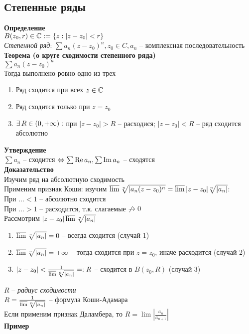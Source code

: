 \documentclass[12pt]{article}
\begin{document}
\subsection{Степенные ряды}
\textbf{Определение}\\
$B(z_0, r) \in \mathbb{C} := \{z: |z-z_0| < r\}$\\
\textit{Степенной ряд}: $\sum a_n(z-z_0)^n, z_0 \in C, a_n$ -- комплексная последовательность\\
\textbf{Теорема (о круге сходимости степенного ряда)}\\
$\sum a_n(z-z_0)^n$\\
Тогда выполнено ровно одно из трех
\begin{enumerate}
    \item Ряд сходится при всех $z \in \mathbb{C}$
    \item Ряд сходится только при $z=z_0$
    \item $\exists\, R \in (0, +\infty): $ при $|z-z_0| > R$ -- расходися; $|z-z_0|<R$ -- ряд сходится абсолютно
\end{enumerate}
\textbf{Утверждение}\\
$\sum a_n$ -- сходится $\Leftrightarrow \sum \operatorname{Re} a_n, \sum \operatorname{Im} a_n$ -- сходятся\\
\textbf{Доказательство}\\
Изучим ряд на абсолютную сходимость\\
Применим признак Коши: изучим $\operatorname*{\overline{lim}} \sqrt[n]{|a_n(z-z_0)^n} = \operatorname*{\overline{lim}} |z-z_0|\sqrt[n]{|a_n|}$:\\
При $\ldots<1$ -- абсолютно сходится\\
При $\ldots > 1$ -- расходится, т.к. слагаемые $\not\rightarrow 0$\\
Рассмотрим $|z-z_0|\operatorname*{\overline{lim}} \sqrt[n]{|a_n|}$
\begin{enumerate}
    \item $\operatorname*{\overline{lim}} \sqrt[n]{|a_n|} = 0$ -- всегда сходится (случай 1)
    \item $\operatorname*{\overline{lim}} \sqrt[n]{|a_n|} = +\infty$ -- тогда сходится при $z=z_0$, иначе расходится (случай 2)
    \item $|z-z_0| < \frac1{\operatorname*{\overline{lim}} \sqrt[n]{|a_n|}} =: R$ -- сходится в $B(z_0, R)$ (случай 3)
\end{enumerate}
$R$ -- \textit{радиус сходимости}\\
$R = \frac1{\operatorname*{\overline{lim}} \sqrt[n]{|a_n|}}$ -- формула Коши-Адамара\\
Если применим признак Даламбера, то $R = \lim |\frac{a_n}{a_{n+1}}|$\\
\textbf{Пример}
\end{document}
